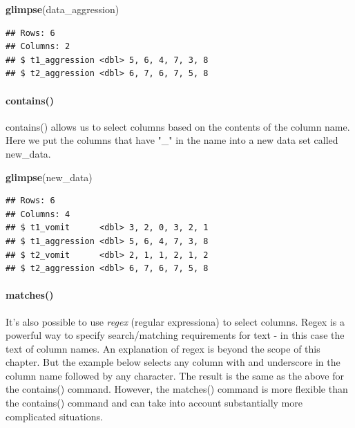 \documentclass[
]{krantz}
\makeatletter
\newenvironment{Shaded}{\begin{snugshade}}{\end{snugshade}}
\newcommand{\KeywordTok}[1]{\textcolor[rgb]{0.27,0.27,0.27}{\textbf{#1}}}
\newcommand{\NormalTok}[1]{#1}
\newcommand{\OperatorTok}[1]{\textcolor[rgb]{0.43,0.43,0.43}{\textbf{#1}}}
\newcommand{\StringTok}[1]{\textcolor[rgb]{0.5,0.5,0.5}{#1}}
\newenvironment{kframe}{%
\medskip{}
\setlength{\fboxsep}{.8em}
 \def\at@end@of@kframe{}%
 \ifinner\ifhmode%
  \def\at@end@of@kframe{\end{minipage}}%
  \begin{minipage}{\columnwidth}%
 \fi\fi%
 \def\FrameCommand##1{\hskip\@totalleftmargin \hskip-\fboxsep
 \colorbox{shadecolor}{##1}\hskip-\fboxsep
     \hskip-\linewidth \hskip-\@totalleftmargin \hskip\columnwidth}%
 \MakeFramed {\advance\hsize-\width
   \@totalleftmargin\z@ \linewidth\hsize
   \@setminipage}}%
 {\par\unskip\endMakeFramed%
 \at@end@of@kframe}
\renewenvironment{Shaded}{\begin{kframe}}{\end{kframe}}
\makeatother
\begin{document}
\begin{Shaded}
\begin{Highlighting}[]
\KeywordTok{glimpse}\NormalTok{(data_aggression)}
\end{Highlighting}
\end{Shaded}

\begin{verbatim}
## Rows: 6
## Columns: 2
## $ t1_aggression <dbl> 5, 6, 4, 7, 3, 8
## $ t2_aggression <dbl> 6, 7, 6, 7, 5, 8
\end{verbatim}

\hypertarget{contains}{%
\paragraph{contains()}\label{contains}}

contains() allows us to select columns based on the contents of the column name. Here we put the columns that have "\_" in the name into a new data set called new\_data.

\begin{Shaded}
\end{Shaded}

\begin{Shaded}
\begin{Highlighting}[]
\KeywordTok{glimpse}\NormalTok{(new_data)}
\end{Highlighting}
\end{Shaded}

\begin{verbatim}
## Rows: 6
## Columns: 4
## $ t1_vomit      <dbl> 3, 2, 0, 3, 2, 1
## $ t1_aggression <dbl> 5, 6, 4, 7, 3, 8
## $ t2_vomit      <dbl> 2, 1, 1, 2, 1, 2
## $ t2_aggression <dbl> 6, 7, 6, 7, 5, 8
\end{verbatim}

\hypertarget{matches}{%
\paragraph{matches()}\label{matches}}

It's also possible to use \emph{regex} (regular expressiona) to select columns. Regex is a powerful way to specify search/matching requirements for text - in this case the text of column names. An explanation of regex is beyond the scope of this chapter. But the example below selects any column with and underscore in the column name followed by any character. The result is the same as the above for the contains() command. However, the matches() command is more flexible than the contains() command and can take into account substantially more complicated situations.
\end{document}
